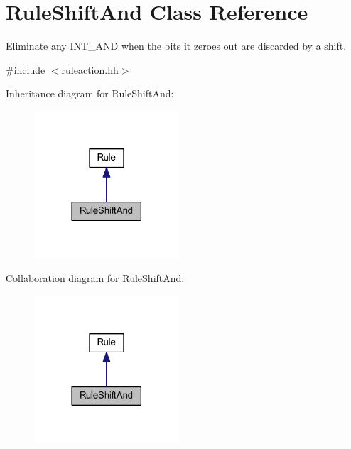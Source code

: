 \hypertarget{class_rule_shift_and}{}\section{Rule\+Shift\+And Class Reference}
\label{class_rule_shift_and}


Eliminate any I\+N\+T\+\_\+\+A\+ND when the bits it zeroes out are discarded by a shift.  




{\ttfamily \#include $<$ruleaction.\+hh$>$}



Inheritance diagram for Rule\+Shift\+And\+:
\nopagebreak
\begin{figure}[H]
\begin{center}
\leavevmode
\includegraphics[width=153pt]{class_rule_shift_and__inherit__graph}
\end{center}
\end{figure}


Collaboration diagram for Rule\+Shift\+And\+:
\nopagebreak
\begin{figure}[H]
\begin{center}
\leavevmode
\includegraphics[width=153pt]{class_rule_shift_and__coll__graph}
\end{center}
\end{figure}
